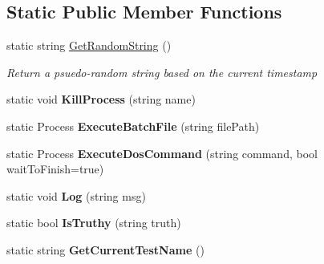 \subsection*{Static Public Member Functions}
\begin{DoxyCompactItemize}
\item 
static string \hyperlink{class_proto_test_1_1_golem_1_1_core_1_1_common_a9a4e1be518cc2cab1b4f95086d300252}{Get\-Random\-String} ()
\begin{DoxyCompactList}\small\item\em Return a psuedo-\/random string based on the current timestamp \end{DoxyCompactList}\item 
\hypertarget{class_proto_test_1_1_golem_1_1_core_1_1_common_ad06311deb50782d404b968e610716b85}{static void {\bfseries Kill\-Process} (string name)}\label{class_proto_test_1_1_golem_1_1_core_1_1_common_ad06311deb50782d404b968e610716b85}

\item 
\hypertarget{class_proto_test_1_1_golem_1_1_core_1_1_common_ac3b0821294fa903cd881aca0f07f3305}{static Process {\bfseries Execute\-Batch\-File} (string file\-Path)}\label{class_proto_test_1_1_golem_1_1_core_1_1_common_ac3b0821294fa903cd881aca0f07f3305}

\item 
\hypertarget{class_proto_test_1_1_golem_1_1_core_1_1_common_a1cf98c0166de36d99f5cf4c75a3e4ec8}{static Process {\bfseries Execute\-Dos\-Command} (string command, bool wait\-To\-Finish=true)}\label{class_proto_test_1_1_golem_1_1_core_1_1_common_a1cf98c0166de36d99f5cf4c75a3e4ec8}

\item 
\hypertarget{class_proto_test_1_1_golem_1_1_core_1_1_common_a87fd24113cf1bb80143e800c671a43b3}{static void {\bfseries Log} (string msg)}\label{class_proto_test_1_1_golem_1_1_core_1_1_common_a87fd24113cf1bb80143e800c671a43b3}

\item 
\hypertarget{class_proto_test_1_1_golem_1_1_core_1_1_common_ab155bcd790e9090b3b028d016ec7feda}{static bool {\bfseries Is\-Truthy} (string truth)}\label{class_proto_test_1_1_golem_1_1_core_1_1_common_ab155bcd790e9090b3b028d016ec7feda}

\item 
\hypertarget{class_proto_test_1_1_golem_1_1_core_1_1_common_a47f985a1485c0089c663e36f27fa681e}{static string {\bfseries Get\-Current\-Test\-Name} ()}\label{class_proto_test_1_1_golem_1_1_core_1_1_common_a47f985a1485c0089c663e36f27fa681e}


\end{DoxyCompactItemize}
